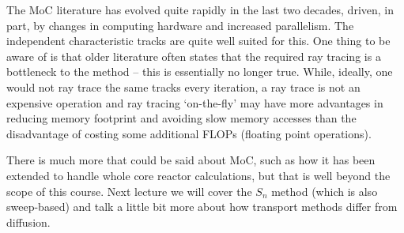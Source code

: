 \documentclass{article}
\begin{document}
The MoC literature has evolved quite rapidly in the last two decades, driven, in part, by changes in computing hardware and increased parallelism. The independent characteristic tracks are quite well suited for this. One thing to be aware of is that older literature often states that the required ray tracing is a bottleneck to the method -- this is essentially no longer true. While, ideally, one would not ray trace the same tracks every iteration, a ray trace is not an expensive operation and ray tracing `on-the-fly' may have more advantages in reducing memory footprint and avoiding slow memory accesses than the disadvantage of costing some additional FLOPs (floating point operations).

There is much more that could be said about MoC, such as how it has been extended to handle whole core reactor calculations, but that is well beyond the scope of this course. Next lecture we will cover the $S_n$ method (which is also sweep-based) and talk a little bit more about how transport methods differ from diffusion. 

\printbibliography
\end{document}
